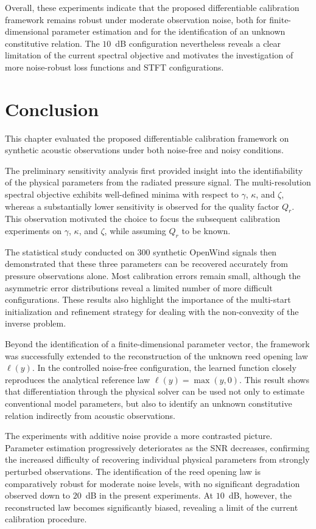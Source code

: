 \documentclass[11pt,a4paper]{report}
\theoremstyle{plain}
\theoremstyle{definition}
\begin{document}
Overall, these experiments indicate that the proposed differentiable
calibration framework remains robust under moderate observation noise, both for
finite-dimensional parameter estimation and for the identification of an
unknown constitutive relation. The $10$~dB configuration nevertheless reveals
a clear limitation of the current spectral objective and motivates the
investigation of more noise-robust loss functions and STFT configurations.

\section{Conclusion}

This chapter evaluated the proposed differentiable calibration framework on
synthetic acoustic observations under both noise-free and noisy conditions.

The preliminary sensitivity analysis first provided insight into the
identifiability of the physical parameters from the radiated pressure signal.
The multi-resolution spectral objective exhibits well-defined minima with
respect to $\gamma$, $\kappa$, and $\zeta$, whereas a substantially lower
sensitivity is observed for the quality factor $Q_r$. This observation
motivated the choice to focus the subsequent calibration experiments on
$\gamma$, $\kappa$, and $\zeta$, while assuming $Q_r$ to be known.

The statistical study conducted on 300 synthetic OpenWind signals then
demonstrated that these three parameters can be recovered accurately from
pressure observations alone. Most calibration errors remain small, although
the asymmetric error distributions reveal a limited number of more difficult
configurations. These results also highlight the importance of the multi-start
initialization and refinement strategy for dealing with the non-convexity of
the inverse problem.

Beyond the identification of a finite-dimensional parameter vector, the
framework was successfully extended to the reconstruction of the unknown reed
opening law $\ell(y)$. In the controlled noise-free configuration, the learned
function closely reproduces the analytical reference law
$\ell(y)=\max(y,0)$. This result shows that differentiation through the
physical solver can be used not only to estimate conventional model
parameters, but also to identify an unknown constitutive relation indirectly
from acoustic observations.

The experiments with additive noise provide a more contrasted picture.
Parameter estimation progressively deteriorates as the SNR decreases,
confirming the increased difficulty of recovering individual physical
parameters from strongly perturbed observations. The identification of the
reed opening law is comparatively robust for moderate noise levels, with no
significant degradation observed down to $20$~dB in the present experiments.
At $10$~dB, however, the reconstructed law becomes significantly biased,
revealing a limit of the current calibration procedure.
\end{document}
